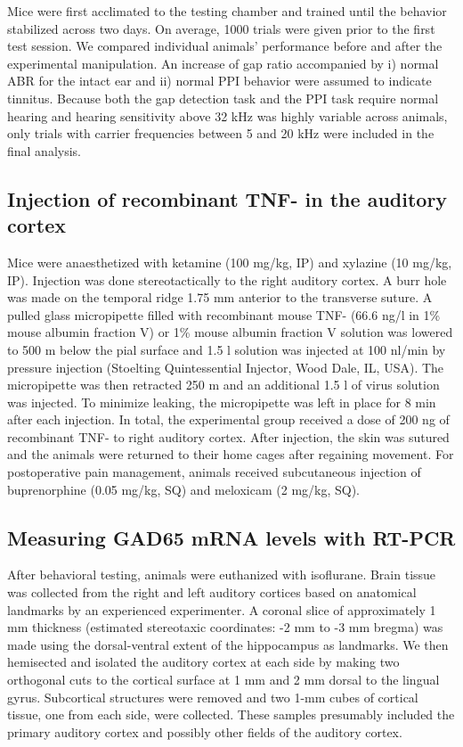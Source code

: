Mice were first acclimated to the testing chamber and trained until the behavior stabilized across two days. On average, 1000 trials were given prior to the first test session. We compared individual animals' performance before and after the experimental manipulation. An increase of gap ratio accompanied by i) normal ABR for the intact ear and ii) normal PPI behavior were assumed to indicate tinnitus. Because both the gap detection task and the PPI task require normal hearing and hearing sensitivity above 32 kHz was highly variable across animals, only trials with carrier frequencies between 5 and 20 kHz were included in the final analysis.

\subsection{Injection of recombinant TNF-\textalpha{} in the auditory cortex}
Mice were anaesthetized with ketamine (100 mg/kg, IP) and xylazine (10 mg/kg, IP). Injection was done stereotactically to the right auditory cortex. A burr hole was made on the temporal ridge 1.75 mm anterior to the transverse suture. A pulled glass micropipette filled with recombinant mouse TNF-\textalpha{} (66.6 ng/\textmu l in 1\% mouse albumin fraction V) or 1\% mouse albumin fraction V solution was lowered to 500 \textmu m below the pial surface and 1.5 \textmu l solution was injected at 100 nl/min by pressure injection (Stoelting Quintessential Injector, Wood Dale, IL, USA). The micropipette was then retracted 250 \textmu m and an additional 1.5 \textmu l of virus solution was injected. To minimize leaking, the micropipette was left in place for 8 min after each injection. In total, the experimental group received a dose of 200 ng of recombinant TNF-\textalpha{} to right auditory cortex. After injection, the skin was sutured and the animals were returned to their home cages after regaining movement. For postoperative pain management, animals received subcutaneous injection of buprenorphine (0.05 mg/kg, SQ) and meloxicam (2 mg/kg, SQ).

\subsection{Measuring GAD65 mRNA levels with RT-PCR}
After behavioral testing, animals were euthanized with isoflurane. Brain tissue was collected from the right and left auditory cortices based on anatomical landmarks by an experienced experimenter. A coronal slice of approximately 1 mm thickness (estimated stereotaxic coordinates: -2 mm to -3 mm bregma) was made using the dorsal-ventral extent of the hippocampus as landmarks. We then hemisected and isolated the auditory cortex at each side by making two orthogonal cuts to the cortical surface at 1 mm and 2 mm dorsal to the lingual gyrus. Subcortical structures were removed and two 1-mm cubes of cortical tissue, one from each side, were collected. These samples presumably included the primary auditory cortex and possibly other fields of the auditory cortex.

